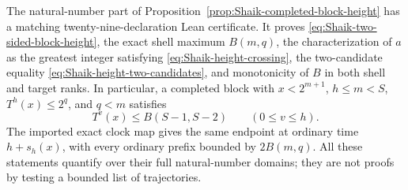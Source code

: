 \begin{proposition}
\label{prop:Shaik-completed-height-certificate}
The natural-number part of
Proposition~\ref{prop:Shaik-completed-block-height} has a matching
twenty-nine-declaration Lean certificate. It proves
\eqref{eq:Shaik-two-sided-block-height}, the exact shell maximum \(B(m,q)\),
the characterization of \(a\) as the greatest integer satisfying
\eqref{eq:Shaik-height-crossing}, the two-candidate equality
\eqref{eq:Shaik-height-two-candidates}, and monotonicity of \(B\) in both
shell and target ranks. In particular, a completed block with
\(x<2^{m+1}\), \(h\le m<S\), \(T^h(x)\le2^q\), and \(q<m\) satisfies
\[
 T^v(x)\le B(S-1,S-2)\qquad(0\le v\le h).
\]
The imported exact clock map gives the same endpoint at ordinary time
\(h+s_h(x)\), with every ordinary prefix bounded by \(2B(m,q)\).
All these statements quantify over their full natural-number domains;
they are not proofs by testing a bounded list of trajectories.
\end{proposition}
